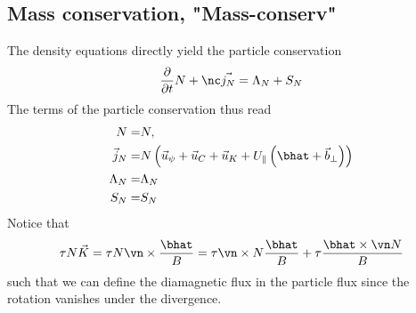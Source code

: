 \subsection{Mass conservation, "Mass-conserv"}
The density equations directly yield the particle conservation
\begin{align} \label{eq:mass_theorem}
  \frac{\partial}{\partial t} N
  + \nc\vec{ j_{N}}
  =  \Lambda_{N}+S_{N}
\end{align}
The terms of the particle conservation thus read
\begin{align}
  N= & N,\\
  \vec j_{N} =& N\left(
  \vec u_\psi + \vec u_C + \vec u_{K} +U_\parallel\left(\bhat+{\vec b}_\perp\right)  \right)
\label{eq:particle_flux}\\
  \Lambda_{N} =& \Lambda_N
\\
  S_{N} =&  S_{N}
\end{align}
Notice that
\begin{align}
\tau N \vec K = \tau N\vn\times\frac{\bhat}{B} = \tau \vn\times N\frac{\bhat}{B} + \tau \frac{\bhat\times\vn N}{B}
\label{}
\end{align}
such that we can define the diamagnetic flux in the particle flux since
the rotation vanishes under the divergence.

